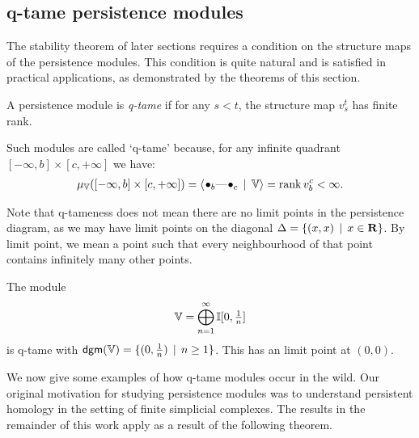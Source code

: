 \subsection{q-tame persistence modules}

The stability theorem of later sections requires a condition on the structure maps of the persistence modules. This condition is quite natural and is satisfied in practical applications, as demonstrated by the theorems of this section.

\begin{definition}
A persistence module is \emph{q-tame} if for any $s < t$, the structure map $v_s^t$ has finite rank.
\end{definition}

Such modules are called `q-tame' because, for any infinite quadrant $[-\infty, b] \times [c, +\infty]$ we have:
\begin{align*}
\mu_\V([-\infty, b] \times [c, +\infty]) = \langle \qon{b} \qem \qon{c} \st \V \rangle = \rank v_b^c < \infty.
\end{align*}

Note that q-tameness does not mean there are no limit points in the persistence diagram, as we may have limit points on the diagonal $\Delta = \{(x, x) \, \mid \, x \in \mathbf{R} \}$. By limit point, we mean a point such that every neighbourhood of that point contains infinitely many other points.

\begin{example}
The module
\begin{align*}
\mathbb{V} = \bigoplus_{n=1}^\infty \mathbb{I}[0, \tfrac{1}{n}]
\end{align*}
is q-tame with $\mathsf{dgm}(\mathbb{V}) = \{ (0, \tfrac{1}{n}) \, \mid \, n \geq 1 \}$. This has an limit point at $(0, 0)$.
\end{example}

We now give some examples of how q-tame modules occur in the wild. Our original motivation for studying persistence modules was to understand persistent homology in the setting of finite simplicial complexes. The results in the remainder of this work apply as a result of the following theorem.

